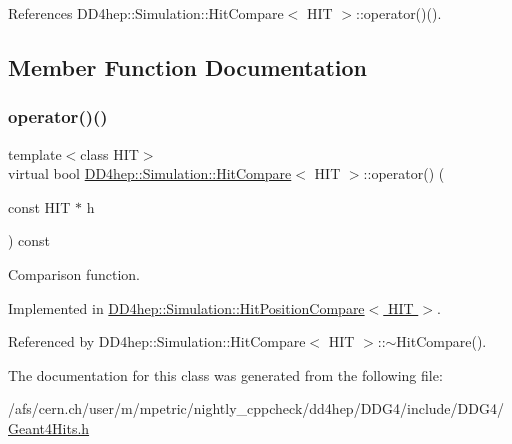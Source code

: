 References D\+D4hep\+::\+Simulation\+::\+Hit\+Compare$<$ H\+I\+T $>$\+::operator()().



\subsection{Member Function Documentation}
\hypertarget{class_d_d4hep_1_1_simulation_1_1_hit_compare_a025eaffc34d0aad36988120c7d158ec7}{}\label{class_d_d4hep_1_1_simulation_1_1_hit_compare_a025eaffc34d0aad36988120c7d158ec7} 
\subsubsection{\texorpdfstring{operator()()}{operator()()}}
{\footnotesize\ttfamily template$<$class H\+IT$>$ \\
virtual bool \hyperlink{class_d_d4hep_1_1_simulation_1_1_hit_compare}{D\+D4hep\+::\+Simulation\+::\+Hit\+Compare}$<$ H\+IT $>$\+::operator() (\begin{DoxyParamCaption}\item[{const H\+IT $\ast$}]{h }\end{DoxyParamCaption}) const\hspace{0.3cm}{\ttfamily [pure virtual]}}



Comparison function. 



Implemented in \hyperlink{struct_d_d4hep_1_1_simulation_1_1_hit_position_compare_aa73aacb44d5a56d3485dd58e38bc505f}{D\+D4hep\+::\+Simulation\+::\+Hit\+Position\+Compare$<$ H\+I\+T $>$}.



Referenced by D\+D4hep\+::\+Simulation\+::\+Hit\+Compare$<$ H\+I\+T $>$\+::$\sim$\+Hit\+Compare().



The documentation for this class was generated from the following file\+:\begin{DoxyCompactItemize}
\item 
/afs/cern.\+ch/user/m/mpetric/nightly\+\_\+cppcheck/dd4hep/\+D\+D\+G4/include/\+D\+D\+G4/\hyperlink{_geant4_hits_8h}{Geant4\+Hits.\+h}\end{DoxyCompactItemize}
